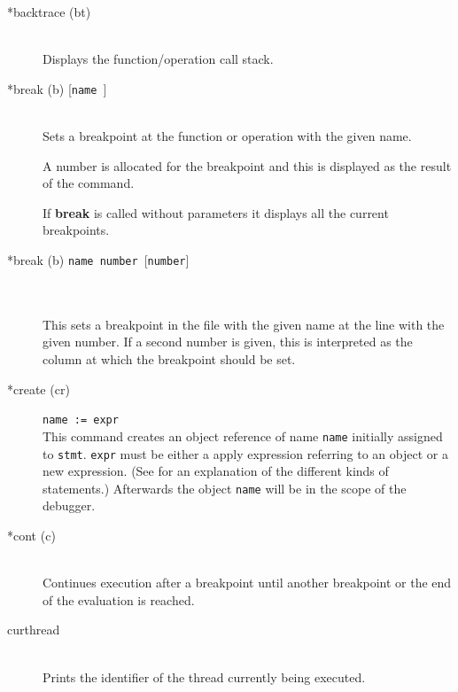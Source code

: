 \documentclass[\pformat,12pt]{article}
\begin{document}
\begin{description}

\item[*backtrace (bt)] \mbox{}\\
  Displays the function/operation
  call stack.
\item[*break (b) \mbox{[{\tt name }]}] 
\mbox{}\\
  Sets a breakpoint at the function or
  operation with the given name.
  
    
    A number is allocated for the  breakpoint and this is displayed
    as the result of the command.

    If \textbf{break} is called without parameters it displays all the
    current breakpoints.

\item[*break (b) \mbox{\texttt{name number} [\texttt{number}]}]\mbox{}\\
\mbox{}\\
 This sets a breakpoint in the file with the given name at the line
 with the given number. If a second number is given, this is
 interpreted as the column at which the breakpoint should be set.
 
\item[*create (cr)] {\tt name := expr}\mbox{}\\
  This command creates an object reference of name {\tt name}
  initially assigned to {\tt stmt}.  {\tt expr} must be either a
  apply expression referring to an object or a new expression. (See
  \cite{LangManPP-SCSK} for an explanation of the different kinds of
  statements.)  Afterwards the object {\tt name} will be in the scope
  of the debugger.

\item[*cont (c)] \mbox{}\\
  Continues execution after a breakpoint until another breakpoint or
  the end of the evaluation is reached.


\item[curthread]\mbox{}\\
  Prints the identifier of the thread currently being executed.


\end{description}
\end{document}
